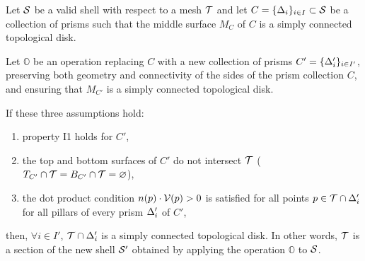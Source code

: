 \begin{theorem}\label{thm:invariants}
Let $\S$ be a valid shell with respect to a mesh $\T$ and let $C=\{\Prism_i\}_{i\in I} \subset \S$ be a collection of prisms such that the middle surface $M_C$ of $C$ is a simply connected topological disk.

Let $\mathbb{O}$ be an operation replacing $C$ with a new collection of prisms $C'=\{\Prism_i'\}_{i\in I'}$, preserving both geometry and connectivity of the sides of the prism collection $C$, and ensuring that $M_{C'}$ is a simply connected topological disk.

If these three assumptions hold:
\begin{enumerate}
    \item property I1 holds for $C'$, %
    \item the top and bottom surfaces of $C'$ do not intersect $\T$ ($T_{C'} \cap \T = B_{C'}\cap \T = \varnothing$), %
    \item the dot product condition $n(p) \cdot \V(p)>0$ is satisfied for all points $p \in \T\cap \Prism_i'$ for all pillars of every prism $\Prism_i'$ of $C'$, %
\end{enumerate}
then, $\forall i \in I'$, $\T \cap \Prism_i'$ is a simply connected topological disk.
In other words, $\T$ is a section of the new shell $\S'$ obtained by applying the operation  $\mathbb{O}$ to $\S$.
\end{theorem}
